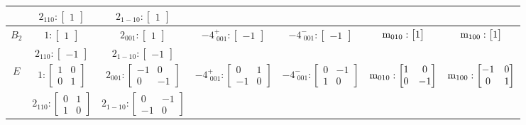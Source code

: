 \documentclass[fleqn,8pt,landscape]{jsarticle}
\begin{document}
\begin{longtable}{ccccccc}
& $ 2{}_{110}:\begin{bmatrix} 1 \end{bmatrix} $ & $ 2{}_{1-10}:\begin{bmatrix} 1 \end{bmatrix} $ & $  $ & $  $ & $  $ & $  $ \\ \hline
$ B_{2} $ & $ 1:\begin{bmatrix} 1 \end{bmatrix} $ & $ 2{}_{001}:\begin{bmatrix} 1 \end{bmatrix} $ & $ -4^{+}_{\,\,001}:\begin{bmatrix} -1 \end{bmatrix} $ & $ -4^{-}_{\,\,001}:\begin{bmatrix} -1 \end{bmatrix} $ & $ {\rm m}_{010}:\begin{bmatrix} 1 \end{bmatrix} $ & $ {\rm m}_{100}:\begin{bmatrix} 1 \end{bmatrix} $ \\
& $ 2{}_{110}:\begin{bmatrix} -1 \end{bmatrix} $ & $ 2{}_{1-10}:\begin{bmatrix} -1 \end{bmatrix} $ & $  $ & $  $ & $  $ & $  $ \\ \hline
$ E $ & $ 1:\begin{bmatrix} 1 & 0 \\ 0 & 1 \end{bmatrix} $ & $ 2{}_{001}:\begin{bmatrix} -1 & 0 \\ 0 & -1 \end{bmatrix} $ & $ -4^{+}_{\,\,001}:\begin{bmatrix} 0 & 1 \\ -1 & 0 \end{bmatrix} $ & $ -4^{-}_{\,\,001}:\begin{bmatrix} 0 & -1 \\ 1 & 0 \end{bmatrix} $ & $ {\rm m}_{010}:\begin{bmatrix} 1 & 0 \\ 0 & -1 \end{bmatrix} $ & $ {\rm m}_{100}:\begin{bmatrix} -1 & 0 \\ 0 & 1 \end{bmatrix} $ \\
& $ 2{}_{110}:\begin{bmatrix} 0 & 1 \\ 1 & 0 \end{bmatrix} $ & $ 2{}_{1-10}:\begin{bmatrix} 0 & -1 \\ -1 & 0 \end{bmatrix} $ & $  $ & $  $ & $  $ & $  $ \\
\end{longtable}
\end{document}
